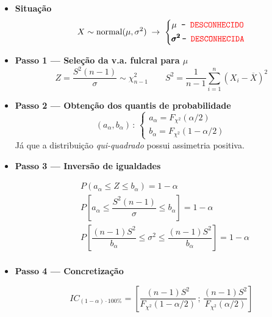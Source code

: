 \begin{mdframed}
    \begin{itemize}[leftmargin=*]
        \item \textbf{Situação}
        $$
            X \sim \text{normal}(\mu, \sigma^2) \;\rightarrow\; \left\{
            \begin{aligned}
                &\mu \mkern9.5mu\texttt{-}\mkern9.5mu \texttt{\color{red} DESCONHECIDO}\\
                &\pmb{\sigma^2} \mkern3mu\texttt{-}\mkern9mu \texttt{\color{red} DESCONHECIDA}
            \end{aligned}\right.
        $$
    
        \item \textbf{Passo 1 --- Seleção da v.a. fulcral para $\mu$}
        $$
            Z = \dfrac{S^2 (n - 1)}{\sigma} \sim \chi^2_{n - 1}\qquad
            S^2 = \dfrac{1}{n - 1} \sum_{i = 1}^{n}(X_i - \overline{X})^2
        $$
    
        \item \textbf{Passo 2 --- Obtenção dos quantis de probabilidade}
         $$
            (a_\alpha, b_\alpha)\, :\, \left\{\begin{array}{ll}
                 a_\alpha = F_{\chi^2}(\alpha/2) \\
                 b_\alpha = F_{\chi^2}(1 - \alpha/2)
            \end{array}\right.
        $$
        \noindent Já que a distribuição \textit{qui-quadrado} possui assimetria positiva.
    
        \vspace{1 em}
        \item \textbf{Passo 3 --- Inversão de igualdades}
    
        $$
            \begin{aligned}
                &P(a_\alpha \leq Z \leq b_\alpha) = 1 - \alpha\\
                &P\left[a_\alpha \leq \dfrac{S^2 (n - 1)}{\sigma} \leq b_\alpha\right] = 1 - \alpha\\
                &P\left[\dfrac{(n-1)S^2}{b_\alpha} \leq \sigma^2 \leq \dfrac{(n-1)S^2}{b_\alpha}\right] = 1 - \alpha\\
            \end{aligned}
        $$
    
        \item\textbf{Passo 4 --- Concretização}
    
        $$
            IC_{(1 - \alpha)\cdot 100\%} = \left[\dfrac{(n-1)S^2}{F_{\chi^2}(1 - \alpha/2)}\,;\, \dfrac{(n-1)S^2}{F_{\chi^2}(\alpha/2)}\right]
        $$
    \end{itemize}
\end{mdframed}

